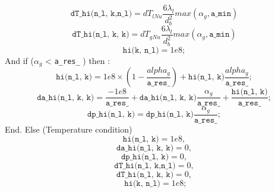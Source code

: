 \begin{equation}
\texttt{dT\_hi(n_l, k,n_l)}= dT_{lNu} \frac{6\lambda_l}{d_b^2}max(\alpha_g,\texttt{a\_min})
\end{equation}
\begin{equation}
\texttt{dT\_hi(n_l, k, k)} = dT_{gNu} \frac{6\lambda_l}{d_b^2}max(\alpha_g,\texttt{a\_min})
\end{equation}
\begin{equation}
            \texttt{hi(k, n_l)} = 1e8;
\end{equation}
And if ($\alpha_g$ < \texttt{a\_res\_} ) then :
\begin{equation}
\texttt{hi(n_l, k)}  = 1e8 \times(1-\frac{alpha_g}{\texttt{a\_res\_} }) + \texttt{hi(n_l, k)} \frac{alpha_g}{\texttt{a\_res\_} };
\end{equation}
\begin{equation}
\texttt{da\_hi(n_l, k, k)} =  \frac{-1e8}{\texttt{a\_res\_} } + \texttt{da\_hi(n_l, k, k)}\frac{\alpha_g}{\texttt{a\_res\_} } + \frac{\texttt{hi(n_l, k)}}{\texttt{a\_res\_} };
\end{equation}
\begin{equation}
\texttt{dp\_hi(n_l, k)}    = \texttt{dp\_hi(n_l, k)}\frac{\alpha_g}{\texttt{a\_res\_} } ;
\end{equation}
End. Else (Temperature condition)
\begin{equation}
    \texttt{hi(n_l, k)} = 1e8, 
\end{equation}
\begin{equation}
\texttt{da\_hi(n_l, k, k)} = 0,
\end{equation}
\begin{equation}
 \texttt{dp\_hi(n_l, k)}    = 0,
\end{equation}
\begin{equation}
\texttt{dT\_hi(n_l, k,n_l)}= 0,
\end{equation}
\begin{equation}
\texttt{dT\_hi(n_l, k, k)} = 0,
\end{equation}
\begin{equation}
           \texttt{ hi(k, n_l)} = 1e8;
\end{equation}

